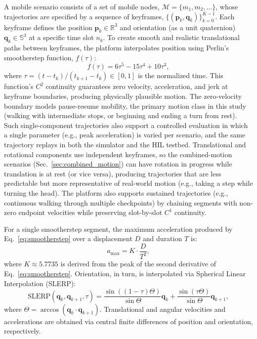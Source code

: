 \documentclass[fleqn,10pt]{wlscirep}
\newcommand{\rev}[1]{{\color{revblue}#1}}
\begin{document}
A mobile scenario consists of a set of mobile nodes, $\mathcal{M} = \{m_1, m_2, \dots\}$, whose trajectories are specified by a sequence of keyframes, $\{(\mathbf{p}_k, \mathbf{q}_k)\}_{k=0}^{K-1}$. Each keyframe defines the position $\mathbf{p}_k \in \mathbb{R}^3$ and orientation (as a unit quaternion) $\mathbf{q}_k \in \mathbb{S}^3$ at a specific time slot $n_k$. To create smooth and realistic translational paths between keyframes, the platform interpolates position using Perlin's smootherstep function\cite{Perlin2002}, $f(\tau)$:
\begin{equation}
f(\tau) = 6\tau^5 - 15\tau^4 + 10\tau^3,
\label{eq:smootherstep}
\end{equation}
where $\tau = (t - t_k) / (t_{k+1} - t_k) \in [0, 1]$ is the normalized time. This function's $C^2$ continuity guarantees zero velocity, acceleration, and jerk at keyframe boundaries, producing physically plausible motion. \rev{The zero-velocity boundary models pause-resume mobility, the primary motion class in this study (walking with intermediate stops, or beginning and ending a turn from rest). Such single-component trajectories also support a controlled evaluation in which a single parameter (e.g., peak acceleration) is varied per scenario, and the same trajectory replays in both the simulator and the HIL testbed. Translational and rotational components use independent keyframes, so the combined-motion scenarios (Sec.~\ref{sec:combined_motion}) can have rotation in progress while translation is at rest (or vice versa), producing trajectories that are less predictable but more representative of real-world motion (e.g., taking a step while turning the head). The platform also supports sustained trajectories (e.g., continuous walking through multiple checkpoints) by chaining segments with non-zero endpoint velocities while preserving slot-by-slot $C^1$ continuity.}

\rev{For a single smootherstep segment,} the maximum acceleration \rev{produced by Eq.~\eqref{eq:smootherstep}} over a displacement $D$ \rev{and} duration $T$ is:
\begin{equation}
    a_{\max} = K \cdot \frac{D}{T^2},
\end{equation}
where $K \approx 5.7735$ is derived from the peak of the second derivative of Eq.~\eqref{eq:smootherstep}. Orientation, in turn, is interpolated via Spherical Linear Interpolation (SLERP)\rev{\cite{Shoemake1985SLERP}}:
\begin{equation}
    \text{SLERP}(\mathbf{q}_k, \mathbf{q}_{k+1}, \tau) = \frac{\sin((1-\tau)\Theta)}{\sin\Theta}\mathbf{q}_k + \frac{\sin(\tau\Theta)}{\sin\Theta}\mathbf{q}_{k+1},
\end{equation}
where $\Theta = \arccos(\mathbf{q}_k \cdot \mathbf{q}_{k+1})$. Translational and angular velocities and accelerations are obtained via central finite differences of position and orientation, respectively.
\end{document}
